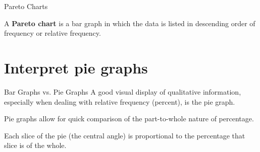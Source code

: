 \documentclass[t]{beamer}
\begin{document}
\begin{frame}{Pareto Charts}
\begin{tcolorbox}[colframe=green!20!black, colback = green!30!white,title=\textbf{Pareto Chart}]
A \textbf{Pareto chart} is a bar graph in which the data is listed in descending order of frequency or relative frequency.
\end{tcolorbox}
\vspace{6pt} \pause
\begin{center}
\end{center}
\end{frame}

\section{Interpret pie graphs}

\begin{frame}{Bar Graphs vs. Pie Graphs}
A good visual display of qualitative information, especially when dealing with relative frequency (percent), is the pie graph.	\newline\\	\pause

Pie graphs allow for quick comparison of the part-to-whole nature of percentage. \newline\\	\pause

Each slice of the pie (the central angle) is proportional to the percentage that slice is of the whole.
\end{frame}
\end{document}
